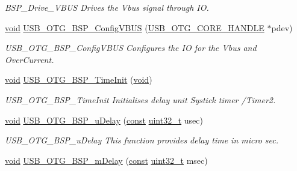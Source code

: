 \begin{DoxyCompactItemize}
\begin{DoxyCompactList}\small\item\em B\-S\-P\-\_\-\-Drive\-\_\-\-V\-B\-U\-S Drives the Vbus signal through I\-O. \end{DoxyCompactList}\item 
\hyperlink{group___n_a_m_e_ga18028b8badbf1ea7e704ccac3c488e82}{void} \hyperlink{group___u_s_b___b_s_p___private___functions_ga02dee21bb9a092415782c0e1a460981c}{U\-S\-B\-\_\-\-O\-T\-G\-\_\-\-B\-S\-P\-\_\-\-Config\-V\-B\-U\-S} (\hyperlink{group___u_s_b___c_o_r_e___exported___types_gaf76054c11eb8a3367907aad7ae700e80}{U\-S\-B\-\_\-\-O\-T\-G\-\_\-\-C\-O\-R\-E\-\_\-\-H\-A\-N\-D\-L\-E} $\ast$pdev)
\begin{DoxyCompactList}\small\item\em U\-S\-B\-\_\-\-O\-T\-G\-\_\-\-B\-S\-P\-\_\-\-Config\-V\-B\-U\-S Configures the I\-O for the Vbus and Over\-Current. \end{DoxyCompactList}\item 
\hyperlink{group___n_a_m_e_ga18028b8badbf1ea7e704ccac3c488e82}{void} \hyperlink{group___u_s_b___b_s_p___private___functions_ga880a11758cfe2348112a30a0ea44c32f}{U\-S\-B\-\_\-\-O\-T\-G\-\_\-\-B\-S\-P\-\_\-\-Time\-Init} (\hyperlink{group___n_a_m_e_ga18028b8badbf1ea7e704ccac3c488e82}{void})
\begin{DoxyCompactList}\small\item\em U\-S\-B\-\_\-\-O\-T\-G\-\_\-\-B\-S\-P\-\_\-\-Time\-Init Initialises delay unit Systick timer /\-Timer2. \end{DoxyCompactList}\item 
\hyperlink{group___n_a_m_e_ga18028b8badbf1ea7e704ccac3c488e82}{void} \hyperlink{group___u_s_b___b_s_p___private___functions_gaa70213d9a7b9b047dc6d3357f99e19b5}{U\-S\-B\-\_\-\-O\-T\-G\-\_\-\-B\-S\-P\-\_\-u\-Delay} (\hyperlink{group___n_a_m_e_ga7ae6d0e43244213b34de2c2b9aa30da6}{const} \hyperlink{stdint_8h_a435d1572bf3f880d55459d9805097f62}{uint32\-\_\-t} usec)
\begin{DoxyCompactList}\small\item\em U\-S\-B\-\_\-\-O\-T\-G\-\_\-\-B\-S\-P\-\_\-u\-Delay This function provides delay time in micro sec. \end{DoxyCompactList}\item 
\hyperlink{group___n_a_m_e_ga18028b8badbf1ea7e704ccac3c488e82}{void} \hyperlink{group___u_s_b___b_s_p___private___functions_ga28c906bec05a1b7f91aa0e4ff5d8a16c}{U\-S\-B\-\_\-\-O\-T\-G\-\_\-\-B\-S\-P\-\_\-m\-Delay} (\hyperlink{group___n_a_m_e_ga7ae6d0e43244213b34de2c2b9aa30da6}{const} \hyperlink{stdint_8h_a435d1572bf3f880d55459d9805097f62}{uint32\-\_\-t} msec)

\end{DoxyCompactItemize}
